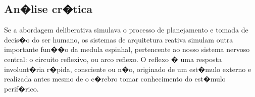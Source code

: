 % 
% 
% 
% 

\subsection{An�lise cr�tica}
Se a abordagem deliberativa simulava o processo de planejamento e tomada de
decis�o do ser humano, os sistemas de arquitetura reativa simulam outra
importante fun��o da medula espinhal, pertencente ao nosso sistema nervoso
central: o circuito reflexivo, ou arco reflexo. O reflexo � uma resposta
involunt�ria r�pida, consciente ou n�o, originado de um est�mulo externo e
realizada antes mesmo de o c�rebro tomar conhecimento do est�mulo perif�rico.




